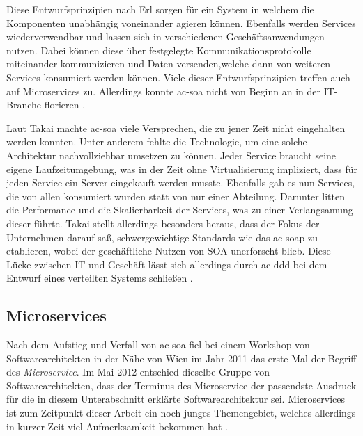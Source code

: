     Diese Entwurfsprinzipien nach Erl sorgen für ein System in welchem die Komponenten unabhängig voneinander agieren können. Ebenfalls werden Services wiederverwendbar und lassen sich in verschiedenen Geschäftsanwendungen nutzen. Dabei können diese über festgelegte Kommunikationsprotokolle miteinander kommunizieren und Daten versenden,\clearpage welche dann von weiteren Services konsumiert werden können. Viele dieser Entwurfsprinzipien treffen auch auf Microservices zu. Allerdings konnte \gls{ac-soa} nicht von Beginn an in der IT-Branche florieren \parencites[S. 14--15]{takai2017architektur}{erl2005soa}[S. 22]{gallipeau2018microservices}.

    Laut Takai machte \gls{ac-soa} viele Versprechen, die zu jener Zeit nicht eingehalten werden konnten. Unter anderem fehlte die Technologie, um eine solche Architektur nachvollziehbar umsetzen zu können. Jeder Service braucht seine eigene Laufzeitumgebung, was in der Zeit ohne Virtualisierung impliziert, dass für jeden Service ein Server eingekauft werden musste. Ebenfalls gab es nun Services, die von allen konsumiert wurden statt von nur einer Abteilung. Darunter litten die Performance und die Skalierbarkeit der Services, was zu einer Verlangsamung dieser führte. Takai stellt allerdings besonders heraus, dass der Fokus der Unternehmen darauf saß, schwergewichtige Standards wie das \gls{ac-soap} zu etablieren, wobei der geschäftliche Nutzen von SOA unerforscht blieb. Diese Lücke zwischen IT und Geschäft lässt sich allerdings durch \gls{ac-ddd} bei dem Entwurf eines verteilten Systems schließen \parencite[S. 16]{takai2017architektur}.

    \subsection{Microservices}
    \label{subsec:microservices}

    Nach dem Aufstieg und Verfall von \gls{ac-soa} fiel bei einem Workshop von Softwarearchitekten in der Nähe von Wien im Jahr 2011 das erste Mal der Begriff des \emph{Microservice}. Im Mai 2012 entschied dieselbe Gruppe von Softwarearchitekten, dass der Terminus des Microservice der passendste Ausdruck für die in diesem Unterabschnitt erklärte Softwarearchitektur sei. Microservices ist zum Zeitpunkt dieser Arbeit ein noch junges Themengebiet, welches allerdings in kurzer Zeit viel Aufmerksamkeit bekommen hat \parencite{fowlerlewis2014microservices}.

